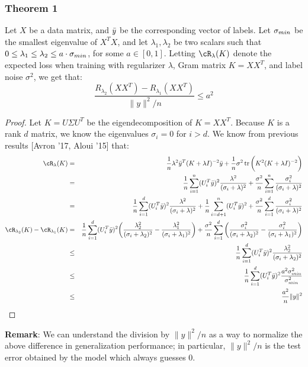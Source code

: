 \documentclass[12pt]{article}
\begin{document}
\subsubsection{Theorem 1}
\begin{theorem}
Let $X$ be a data matrix, and $\by$ be the corresponding vector of labels. Let $\sm$ be the smallest eigenvalue of $X^T X$, and let $\lambda_1, \lambda_2$ be two scalars such that $0 \leq \lambda_1 \leq \lambda_2 \leq a\cdot \sm$, for some $a \in [0,1]$. Letting $\cR_{\lambda}(K)$ denote the expected loss when training with regularizer $\lambda$, Gram matrix $K = XX^T$, and label noise $\sigma^2$, we get that:
\begin{equation}
\frac{R_{\lambda_2}(XX^T) - R_{\lambda_1}(XX^T)}{\|y\|^2/n} \leq a^2
\label{eq1}
\end{equation}
\end{theorem}
\begin{proof}
Let $K = U\Sigma U^T$ be the eigendecomposition of $K = XX^T$. Because $K$ is a rank $d$ matrix, we know the eigenvalues $\sigma_i=0$ for $i > d$.  We know from previous results [Avron '17, Aloui '15] that:
\begin{eqnarray*}
\cR_{\lambda}(K) &=& \frac{1}{n}\lambda^2\by^T(K+\lambda I)^{-2} \by + \frac{1}{n}\sigma^2 \tr\bigg(K^2(K+\lambda I)^{-2}\bigg) \\
&=& \frac{1}{n}\sum_{i=1}^n (U_i^T \by)^2\frac{\lambda^2}{(\sigma_i + \lambda)^2} + \frac{\sigma^2}{n}\sum_{i=1}^n \frac{\sigma_i^2}{(\sigma_i + \lambda)^2} \\
&=& \frac{1}{n}\sum_{i=1}^d (U_i^T \by)^2\frac{\lambda^2}{(\sigma_i + \lambda)^2} +
\frac{1}{n}\sum_{i=d+1}^n (U_i^T \by)^2 +
 \frac{\sigma^2}{n}\sum_{i=1}^d \frac{\sigma_i^2}{(\sigma_i + \lambda)^2} \\
\cR_{\lambda_2}(K) - \cR_{\lambda_1}(K) 
&=& \frac{1}{n}\sum_{i=1}^d (U_i^T \by)^2\bigg(\frac{\lambda_2^2}{(\sigma_i + \lambda_2)^2} - \frac{\lambda_1^2}{(\sigma_i + \lambda_1)^2}\bigg) +
\frac{\sigma^2}{n}\sum_{i=1}^d \bigg(\frac{\sigma_i^2}{(\sigma_i + \lambda_2)^2} - \frac{\sigma_i^2}{(\sigma_i + \lambda_1)^2} \bigg)\\
&\leq& \frac{1}{n}\sum_{i=1}^d (U_i^T \by)^2\frac{\lambda_2^2}{(\sigma_i + \lambda_2)^2}\\
&\leq& \frac{1}{n}\sum_{i=1}^d (U_i^T \by)^2\frac{a^2 \sm^2}{\sm^2}\\
&\leq& \frac{a^2}{n}\|y\|^2
\end{eqnarray*}
\end{proof}
\textbf{Remark}: We can understand the division by $\|y\|^2/n$ as a way to normalize the above difference in generalization performance; in particular, $\|y\|^2/n$ is the test error obtained by the model which always guesses $0$.
\end{document}
